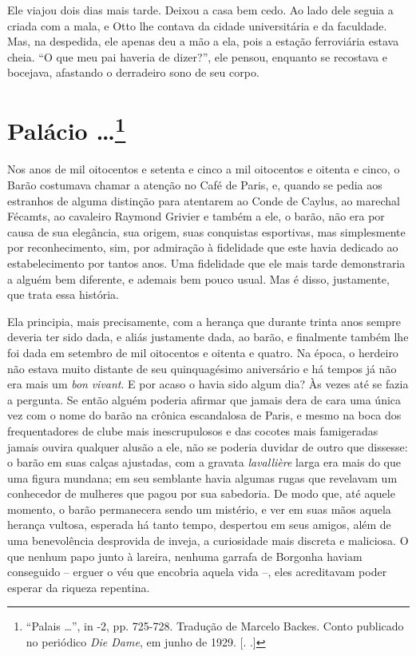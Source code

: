 Ele viajou dois dias mais tarde. Deixou a casa bem cedo. Ao lado dele
seguia a criada com a mala, e Otto lhe contava da cidade universitária e
da faculdade. Mas, na despedida, ele apenas deu a mão a ela, pois a
estação ferroviária estava cheia. ``O que meu pai haveria de dizer?'',
ele pensou, enquanto se recostava e bocejava, afastando o derradeiro
sono de seu corpo.

\chapter{Palácio \ldots{}\footnote[*]{``Palais \ldots{}'', in  -2, pp.
  725-728. Tradução de Marcelo Backes. Conto publicado no periódico
  \emph{Die Dame}, em junho de 1929. [. .]} }

Nos anos de mil oitocentos e setenta e cinco a mil oitocentos e oitenta
e cinco, o Barão  costumava chamar a atenção no Café de Paris, e,
quando se pedia aos estranhos de alguma distinção para atentarem ao
Conde de Caylus, ao marechal Fécamts, ao cavaleiro Raymond Grivier e
também a ele, o barão, não era por causa de sua elegância, sua origem,
suas conquistas esportivas, mas simplesmente por reconhecimento, sim,
por admiração à fidelidade que este havia dedicado ao estabelecimento
por tantos anos. Uma fidelidade que ele mais tarde demonstraria a alguém
bem diferente, e ademais bem pouco usual. Mas é disso, justamente, que
trata essa história.

Ela principia, mais precisamente, com a herança que durante trinta anos
sempre deveria ter sido dada, e aliás justamente dada, ao barão, e
finalmente também lhe foi dada em setembro de mil oitocentos e oitenta e
quatro. Na época, o herdeiro não estava muito distante de seu
quinquagésimo aniversário e há tempos já não era mais um \emph{bon}
\emph{vivant}. E por acaso o havia sido algum dia? Às vezes até se fazia
a pergunta. Se então alguém poderia afirmar que jamais dera de cara uma
única vez com o nome do barão na crônica escandalosa de Paris, e mesmo
na boca dos frequentadores de clube mais inescrupulosos e das cocotes
mais famigeradas jamais ouvira qualquer alusão a ele, não se poderia
duvidar de outro que dissesse: o barão em suas calças ajustadas, com a
gravata \emph{lavallière} larga era mais do que uma figura mundana; em
seu semblante havia algumas rugas que revelavam um conhecedor de
mulheres que pagou por sua sabedoria. De modo que, até aquele momento, o
barão permanecera sendo um mistério, e ver em suas mãos aquela herança
vultosa, esperada há tanto tempo, despertou em seus amigos, além de uma
benevolência desprovida de inveja, a curiosidade mais discreta e
maliciosa. O que nenhum papo junto à lareira, nenhuma garrafa de
Borgonha haviam conseguido -- erguer o véu que encobria aquela vida --,
eles acreditavam poder esperar da riqueza repentina.

